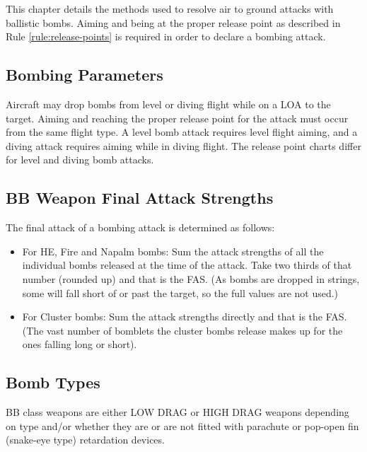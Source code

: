 

\label{rules:bombing-attacks}

This chapter details the methods used to resolve air to ground attacks with ballistic bombs. Aiming and being at the proper release point as described in Rule \ref{rule:release-points} is required in order to declare a bombing attack.

\subsection{Bombing Parameters} Aircraft may drop bombs from level or diving flight while on a LOA to the target. Aiming and reaching the proper release point for the attack must occur from the same flight type. A level bomb attack requires level flight aiming, and a diving attack requires aiming while in diving flight. The release point charts differ for level and diving bomb attacks.

\subsection{BB Weapon Final Attack Strengths} The final attack of a bombing attack is determined as follows:

\begin{itemize}

    \item For HE, Fire and Napalm bombs: Sum the attack strengths of all the individual bombs released at the time of the attack. Take two thirds of that number (rounded up) and that is the FAS. (As bombs are dropped in strings, some will fall short of or past the target, so the full values are not used.)

    \item For Cluster bombs: Sum the attack strengths directly and that is the FAS. (The vast number of bomblets the cluster bombs release makes up for the ones falling long or short).

\end{itemize}

\subsection{Bomb Types} BB class weapons are either LOW DRAG or HIGH DRAG weapons depending on type and/or whether they are or are not fitted with parachute or pop-open fin (snake-eye type) retardation devices.

